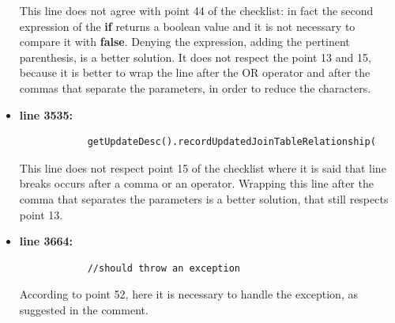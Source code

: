\documentclass[18pt,oneside,a4paper, titlepage]{article}
\begin{document}
\begin{itemize}
			This line does not agree with point 44 of the checklist: in fact the second expression of the \textbf{if} returns a boolean value and it is not necessary to compare it with \textbf{false}. Denying the expression, adding the pertinent parenthesis, is a better solution. It does not respect the point 13 and 15, because it is better to wrap the line after the OR operator and after the commas that separate the parameters, in order to reduce the characters.
			\item \textbf{line 3535:} \begin{lstlisting}
			getUpdateDesc().recordUpdatedJoinTableRelationship(
			\end{lstlisting}
			\vspace{0.1cm}
			This line does not respect point 15 of the checklist where it is said that line breaks occurs after a comma or an operator. Wrapping this line after the comma that separates the parameters is a better solution, that still respects point 13.
			\item \textbf{line 3664:} \begin{lstlisting}
			//should throw an exception
			\end{lstlisting}
			\vspace{0.1cm}
			According to point 52, here it is necessary to handle the exception, as suggested in the comment.
		\end{itemize}
\end{document}
